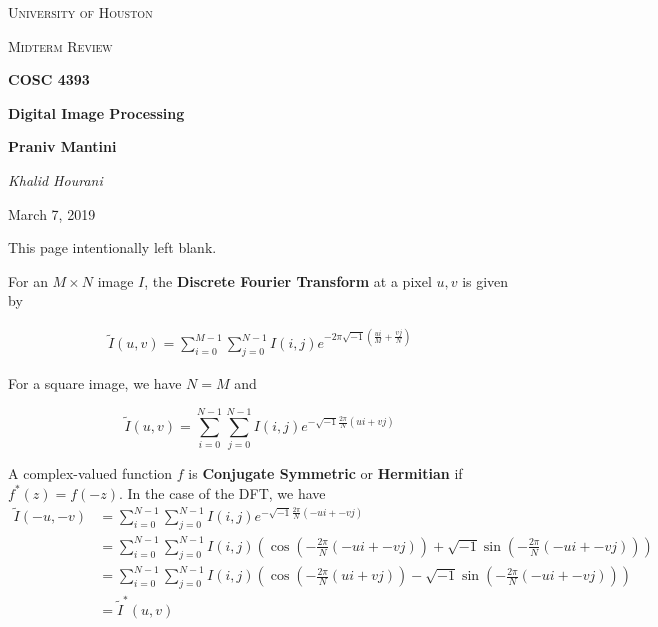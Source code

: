 \documentclass[a4paper]{article}
\begin{document}
\begin{titlepage}
	\centering
	{\scshape\LARGE University of Houston\par}
	\vspace{1cm}
	{\scshape\Large Midterm Review \par}
	\vspace{1.5cm}
	{\huge\bfseries COSC  4393\par}
	{\huge\bfseries Digital Image Processing\par}
	\vspace{0.5cm}
	{\large\bfseries Praniv Mantini\par}
	\vspace{2cm}
	{\Large\itshape Khalid Hourani\par}
	\vspace{0.5cm}
	{\large \par} March 7, 2019
	\vfill

\end{titlepage}
\vspace*{\fill}\begin{center}{\Huge This page intentionally left blank.}\end{center}\vspace*{\fill}\thispagestyle{empty}\clearpage
{}

For an $M\times N$ image $I$, the \textbf{Discrete Fourier Transform} at a pixel $u, v$ is given by 

\begin{align*}
 \tilde{I}(u, v)=\sum_{i=0}^{M-1}\sum_{j=0}^{N-1}I(i, j)e^{-2\pi\sqrt{-1}\left(\frac{ui}{M}+\frac{vj}{N}\right)}
\end{align*}

For a square image, we have $N=M$ and 

\[ \tilde{I}(u, v)=\sum_{i=0}^{N-1}\sum_{j=0}^{N-1}I(i, j)e^{-\sqrt{-1}\frac{2\pi}{N}\left(ui+vj\right)}\]

A complex-valued function $f$ is \textbf{Conjugate Symmetric} or \textbf{Hermitian} if $f^*(z)=f(-z)$. In the case of the DFT, we have 
\begin{align*}
 \tilde{I}(-u, -v)&=\sum_{i=0}^{N-1}\sum_{j=0}^{N-1}I(i, j)e^{-\sqrt{-1}\frac{2\pi}{N}\left(-ui+-vj\right)}
		\\&=\sum_{i=0}^{N-1}\sum_{j=0}^{N-1}I(i, j)\left(\cos{\left(-\frac{2\pi}{N}\left(-ui+-vj\right)\right)}+\sqrt{-1}\sin{\left(-\frac{2\pi}{N}\left(-ui+-vj\right)\right)}\right)
		\\&=\sum_{i=0}^{N-1}\sum_{j=0}^{N-1}I(i, j)\left(\cos{\left(-\frac{2\pi}{N}\left(ui+vj\right)\right)}-\sqrt{-1}\sin{\left(-\frac{2\pi}{N}\left(-ui+-vj\right)\right)}\right)
		\\&=\tilde{I}^*(u, v)
\end{align*}
\end{document}
